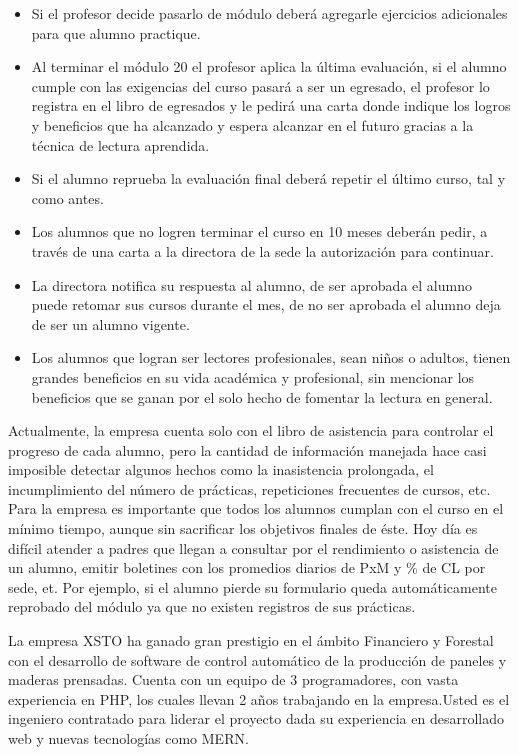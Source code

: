 \documentclass{templateApunte}
\newcommand{\newparagraph}{\par\vspace{\baselineskip}\noindent}
\begin{document}
\begin{itemize}
  \item Si el profesor decide pasarlo de módulo deberá agregarle ejercicios adicionales para que alumno practique.
  \item Al terminar el módulo 20 el profesor aplica la última evaluación, si el alumno cumple con las exigencias del curso pasará a ser un egresado, el profesor lo registra en el libro de egresados y le pedirá una carta donde indique los logros y beneficios que ha alcanzado y espera alcanzar en el futuro gracias a la técnica de lectura aprendida.
  \item Si el alumno reprueba la evaluación final deberá repetir el último curso, tal y como antes.
  \item Los alumnos que no logren terminar el curso en 10 meses deberán pedir, a través de una carta a la directora de la sede la autorización para continuar.
  \item La directora notifica su respuesta al alumno, de ser aprobada el alumno puede retomar sus cursos durante el mes, de no ser aprobada el alumno deja de ser un alumno vigente.
  \item Los alumnos que logran ser lectores profesionales, sean niños o adultos, tienen grandes beneficios en su vida académica y profesional, sin mencionar los beneficios que se ganan por el solo hecho de fomentar la lectura en general. 
\end{itemize}
Actualmente, la empresa cuenta solo con el libro de asistencia para controlar el progreso de cada alumno, pero la cantidad de información manejada hace casi imposible detectar algunos hechos como la inasistencia prolongada, el incumplimiento del número de prácticas, repeticiones frecuentes de cursos, etc.
Para la empresa es importante que todos los alumnos cumplan con el curso en el mínimo tiempo, aunque sin sacrificar los objetivos finales de éste.
Hoy día es difícil atender a padres que llegan a consultar por el rendimiento o asistencia de un alumno, emitir boletines con los promedios diarios de PxM y \% de CL por sede, et.
Por ejemplo, si el alumno pierde su formulario queda automáticamente reprobado del módulo ya que no existen registros de sus prácticas. 
\newparagraph
La empresa XSTO ha ganado gran prestigio en el ámbito Financiero y Forestal con el desarrollo de software de control automático de la producción de paneles y maderas prensadas. Cuenta con un equipo de 3 programadores, con vasta experiencia en PHP, los cuales llevan 2 años trabajando en la empresa.Usted es el ingeniero contratado para liderar el proyecto dada su experiencia en desarrollado web y nuevas tecnologías como MERN. 
\end{document}
